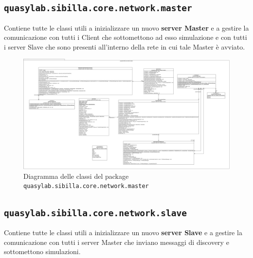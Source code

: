 \subsection{\texttt{quasylab.sibilla.core.network.master}} Contiene tutte le classi utili a inizializzare un nuovo \textbf{server Master} e a gestire la comunicazione con tutti i Client che sottomettono ad esso simulazione e con tutti i server Slave che sono presenti all’interno della rete in cui tale Master è avviato.

\begin{figure}[H]
    \includegraphics[width=\linewidth]{images/quasylab.sibilla.core.network.master.png}
    \captionsetup{justification=centering}
    \caption{Diagramma delle classi del package \texttt{quasylab.sibilla.core.network.master}}
  \end{figure}

\subsection{\texttt{quasylab.sibilla.core.network.slave}} Contiene tutte le classi utili a inizializzare un nuovo \textbf{server Slave} e a gestire la comunicazione con tutti i server Master che inviano messaggi di discovery e sottomettono simulazioni.

